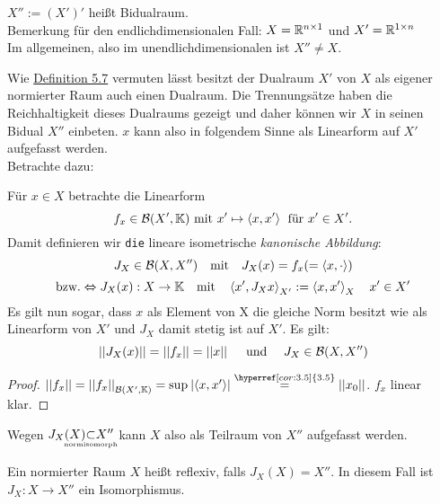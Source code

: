 \normalsize

		\begin{definition}[Bidualraum]
		\label{def:3.7}
			$X'' := (X')' $ heißt Bidualraum. \\
			Bemerkung für den endlichdimensionalen Fall: $X = \mathbb{R}^{n\times 1}$ und $X' = \mathbb{R}^{1 \times n}$ \\
			Im allgemeinen, also im unendlichdimensionalen ist $X'' \neq X$.
		\end{definition}

		Wie \hyperref[def:5.7]{Definition 5.7} vermuten lässt besitzt der Dualraum 
		$X'$ von $X$ als eigener normierter Raum auch einen Dualraum. 
		Die Trennungsätze haben die Reichhaltigkeit dieses Dualraums gezeigt und
		daher können wir $X$ in seinen Bidual $X''$ einbeten. 
		$x$ kann also in folgendem Sinne als Linearform auf $X'$ aufgefasst werden.\\
		Betrachte dazu:

		\begin{bem}[Einbettungsisomorphismus $J_X$]
			\def\varI{Test}
			\def\varII{Test}
		Für $x \in X$ betrachte die Linearform 
			$$f_{x}\in \mathcal{B}(X',\mathbb{K}) \text{ mit } x' \mapsto \langle x, x' \rangle 
				\; \text{ für }x' \in X'.$$ 
		Damit definieren wir {\tt die} lineare 
			isometrische {\it kanonische Abbildung}:
		$${J}_{X}\in \mathcal{B}(X,X'')\quad \text{mit} \quad 
			J_X(x) = f_x (= \langle x, \cdot \rangle)$$
			$$\text{bzw.} \overset{}{\Leftrightarrow} J_X(x) : X \to \mathbb{K} \quad \text{mit} \quad 
				\left \langle x', J_X x \right \rangle_{X'} := \left \langle x,x' \right \rangle_X \quad x'\in X'$$ 
		Es gilt nun sogar, dass $x$ als Element von X die gleiche Norm besitzt 
		wie als Linearform von $X'$ und $J_X$ damit stetig ist auf $X'$. Es gilt:
		$$\left\lvert \left\lvert J_X(x) \right\rvert \right\rvert = \left\lvert \left\lvert f_x \right\rvert \right\rvert = \left\lvert \left\lvert x \right\rvert \right\rvert \quad \text{ und }
			\quad J_X \in \mathcal{B}(X,X'')$$	
	
			\begin{proof}
			$\norm{f_{x}} = \norm{f_{x}}_{\B(X',\K)} 
				= \sup_{}|\langle  x, x' \rangle| 
				\overset{\hyperref[cor:3.5]{3.5}}{=} \norm{x_0}$. 
				$f_{x}$ linear klar.
			\end{proof}
		Wegen $J_X(X) \hspace{-2em}
		\underset{\text{\tiny normisomorph}}{\subset} \hspace{-2em} X''$ 
		kann $X$ also als Teilraum von $X''$ aufgefasst werden.
		
		\end{bem}

	\begin{definition}[Reflexiv]
	\label{def:3.9}
		Ein normierter Raum $X$ heißt reflexiv, falls ${J}_X(X) = X''$. In diesem Fall ist $J_X :X \to X''$ ein Isomorphismus.
	\end{definition}


